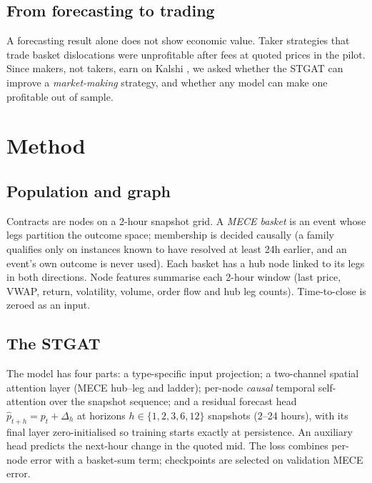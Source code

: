 \documentclass[11pt,a4paper]{article}
\begin{document}
\subsection{From forecasting to trading}
A forecasting result alone does not show economic value. Taker strategies that trade basket dislocations were
unprofitable after fees at quoted prices in the pilot. Since makers, not takers, earn on Kalshi \cite{burgi2025},
we asked whether the STGAT can improve a \emph{market-making} strategy, and whether any model can make one
profitable out of sample.

\section{Method}

\subsection{Population and graph}
Contracts are nodes on a 2-hour snapshot grid. A \emph{MECE basket} is an event whose legs partition the outcome
space; membership is decided causally (a family qualifies only on instances known to have resolved at least 24h
earlier, and an event's own outcome is never used). Each basket has a hub node linked to its legs in both
directions. Node features summarise each 2-hour window (last price, VWAP, return, volatility, volume, order flow and
hub leg counts). Time-to-close is zeroed as an input.

\subsection{The STGAT}
The model has four parts: a type-specific input projection; a two-channel spatial attention layer (MECE hub--leg and
ladder); per-node \emph{causal} temporal self-attention over the snapshot sequence; and a residual forecast head
$\hat p_{t+h} = p_t + \Delta_h$ at horizons $h\in\{1,2,3,6,12\}$ snapshots (2--24 hours), with its final layer
zero-initialised so training starts exactly at persistence. An auxiliary head predicts the next-hour change in the
quoted mid. The loss combines per-node error with a basket-sum term; checkpoints are selected on validation MECE
error.
\end{document}
